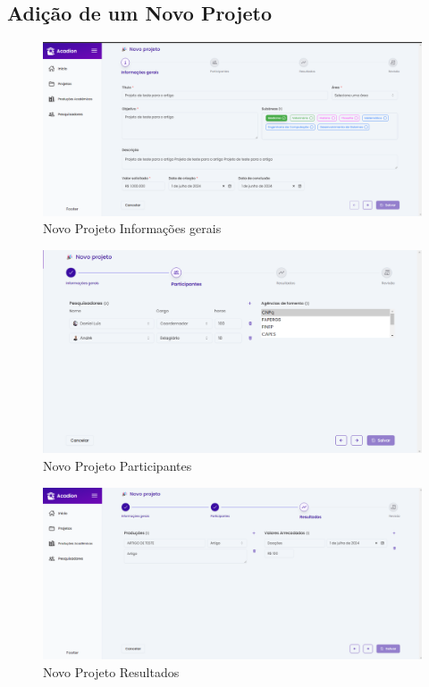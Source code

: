 \subsection{Adição de um Novo Projeto}
\begin{figure}[H]
    \centering
    \includegraphics[width=1\linewidth]{figuras/NovoProjetoIG.png}
    \caption{Novo Projeto Informações gerais}
    \label{fig:addnewprojweb}
\end{figure}

\begin{figure}[H]
    \centering
    \includegraphics[width=1\linewidth]{figuras/NovoPorjetoParti.png}
    \caption{Novo Projeto Participantes}
    \label{fig:enter-label}
\end{figure}
\begin{figure}[H]
    \centering
    \includegraphics[width=1\linewidth]{figuras/NovoPorjetoResultados.png}
    \caption{Novo Projeto Resultados}
    \label{fig:enter-label}
\end{figure}

